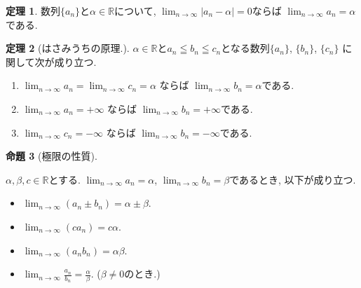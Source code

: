 \documentclass[dvipdfmx,a4paper,11pt]{article}
\newcommand{\R}{\mathbb{R}}
\theoremstyle{definition}
\newtheorem{thm}{定理}
\newtheorem{prop}[thm]{命題}
\begin{document}
  \begin{tcolorbox}[
    colback = white,
    colframe = green!35!black,
    fonttitle = \bfseries,
    breakable = true]
    \begin{thm}
数列$\{ a_n \}$と$\alpha \in \R$について, 
$\lim_{n \rightarrow \infty } | a_n - \alpha |  = 0$ならば
$\lim_{n \rightarrow \infty }a_n =\alpha$である.
 \end{thm}
 \end{tcolorbox}

  \begin{tcolorbox}[
    colback = white,
    colframe = green!35!black,
    fonttitle = \bfseries,
    breakable = true]
    \begin{thm}[はさみうちの原理.]
$\alpha \in \R$と$a_n \leqq b_n \leqq c_n$となる数列$\{ a_n \}$, $\{ b_n \}$, $\{ c_n \}$
に関して次が成り立つ.
\begin{enumerate}
  \setlength{\parskip}{0cm} 
  \setlength{\itemsep}{0cm}
\item $\lim_{n \rightarrow \infty }a_n = \lim_{n \rightarrow \infty }c_n =\alpha$
ならば
$\lim_{n \rightarrow \infty }b_n =\alpha$である.
\item $\lim_{n \rightarrow \infty }a_n = +\infty$
ならば
$\lim_{n \rightarrow \infty }b_n =+\infty$である.
\item $\lim_{n \rightarrow \infty }c_n = -\infty$
ならば
$\lim_{n \rightarrow \infty }b_n =-\infty$である.
\end{enumerate}
 \end{thm}
 \end{tcolorbox}
 
 
  
   \begin{tcolorbox}[
    colback = white,
    colframe = green!35!black,
    fonttitle = \bfseries,
    breakable = true]
    \begin{prop}[極限の性質]
    \label{prop-limit}
 
  $\alpha, \beta, c \in \R$とする.  $\lim_{n \rightarrow \infty} a_n = \alpha$, 
    $\lim_{n \rightarrow \infty} b_n = \beta$であるとき, 以下が成り立つ.
 \begin{itemize}
   \setlength{\parskip}{0cm} 
  \setlength{\itemsep}{0cm}
 \item $\lim_{n \rightarrow \infty} (a_n \pm b_n) = \alpha \pm \beta$.
  \item $\lim_{n \rightarrow \infty} (c a_n ) = c\alpha $.
   \item $\lim_{n \rightarrow \infty} (a_n b_n) = \alpha  \beta$.
    \item $\lim_{n \rightarrow \infty} \frac{a_n}{b_n} = \frac{\alpha}{\beta}$.
    ($\beta \neq 0$のとき.)
 \end{itemize}
        \end{prop}
 \end{tcolorbox}
 
\end{document}
